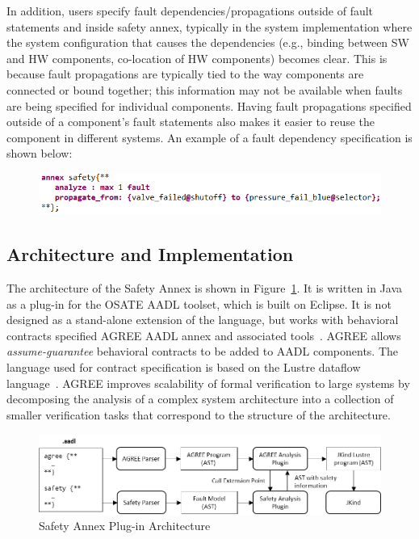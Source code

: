 In addition, users specify fault dependencies/propagations outside of fault statements and inside safety annex, typically in the system implementation where the system configuration that causes the dependencies (e.g., binding between SW and HW components, co-location of HW components) becomes clear. This is because fault propagations are typically tied to the way components are connected or bound together; this information may not be available when faults are being specified for individual components. Having fault propagations specified outside of a component’s fault statements also makes it easier to reuse the component in different systems. An example of a fault dependency specification is shown below:
\begin{figure}[h!]
	\vspace{-0.2in}
	\begin{center}
		\includegraphics[width=.9\textwidth]{images/fault_propagation.png}
	\end{center}
	\vspace{-0.4in}
\end{figure}

\subsection{Architecture and Implementation}

The architecture of the Safety Annex is shown in Figure~\ref{fig:plugin-arch}.  It is written in Java as a plug-in for the OSATE AADL toolset, which is built on Eclipse.  It is not designed as a stand-alone extension of the language, but works with behavioral contracts specified AGREE AADL annex and associated tools~\cite{NFM2012:CoGaMiWhLaLu}.  AGREE allows {\em assume-guarantee} behavioral contracts to be added to AADL components.  The language used for contract specification is based on the Lustre dataflow language~\cite{Halbwachs91:IEEE}. AGREE improves scalability of formal verification to large systems by decomposing the analysis of a complex system architecture into a collection of smaller verification tasks that correspond to the structure of the architecture.

\begin{figure}
	\begin{center}
		\includegraphics[width=.9\textwidth]{images/arch.png}
	\end{center}
	\vspace{-0.2in}
	\caption{Safety Annex Plug-in Architecture}
	\label{fig:plugin-arch}
\end{figure}

